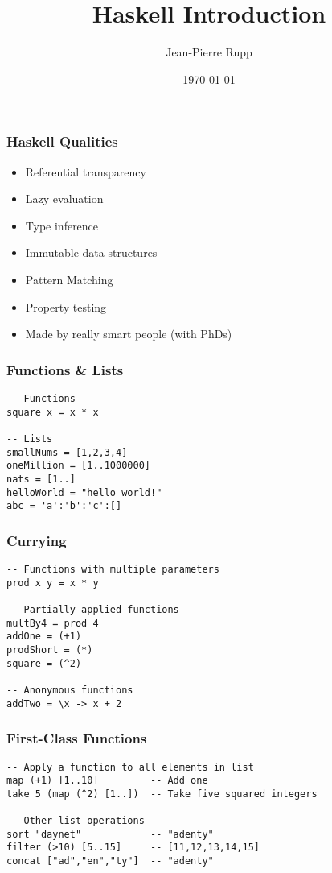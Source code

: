 \documentclass{beamer}
\title[Haskell Intro]{Haskell Introduction}
\author{Jean-Pierre Rupp}
\institute[Haskoin]
{
Haskoin Limited \\
\medskip
\textit{root@haskoin.com}
}
\date{\today}
\begin{document}
\begin{frame}
\titlepage
\end{frame}

\begin{frame}
\frametitle{Haskell Qualities}
\begin{itemize}
\item Referential transparency
\item Lazy evaluation
\item Type inference
\item Immutable data structures
\item Pattern Matching
\item Property testing
\item Made by really smart people (with PhDs)
\end{itemize}
\end{frame}


\begin{frame}[fragile]
\frametitle{Functions \& Lists}
\begin{verbatim}
-- Functions
square x = x * x

-- Lists
smallNums = [1,2,3,4]
oneMillion = [1..1000000]
nats = [1..]
helloWorld = "hello world!"
abc = 'a':'b':'c':[]
\end{verbatim}
\end{frame}


\begin{frame}[fragile]
\frametitle{Currying}
\begin{verbatim}
-- Functions with multiple parameters
prod x y = x * y

-- Partially-applied functions
multBy4 = prod 4
addOne = (+1)
prodShort = (*)
square = (^2)

-- Anonymous functions
addTwo = \x -> x + 2
\end{verbatim}
\end{frame}


\begin{frame}[fragile]
\frametitle{First-Class Functions}
\begin{verbatim}
-- Apply a function to all elements in list
map (+1) [1..10]         -- Add one
take 5 (map (^2) [1..])  -- Take five squared integers

-- Other list operations
sort "daynet"            -- "adenty"
filter (>10) [5..15]     -- [11,12,13,14,15]
concat ["ad","en","ty"]  -- "adenty"
\end{verbatim}
\end{frame}
\end{document}
